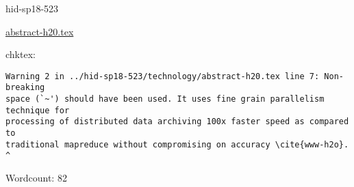

\begin{IU}

hid-sp18-523

\href{https://github.com/cloudmesh-community/hid-sp18-523/blob/master//technology/abstract-h20.tex}{abstract-h20.tex}

 
chktex:
\begin{tiny}
\begin{verbatim}
Warning 2 in ../hid-sp18-523/technology/abstract-h20.tex line 7: Non-breaking
space (`~') should have been used. It uses fine grain parallelism technique for
processing of distributed data archiving 100x faster speed as compared to
traditional mapreduce without compromising on accuracy \cite{www-h2o}.
^
\end{verbatim}
\end{tiny}

Wordcount: 82

\end{IU}



